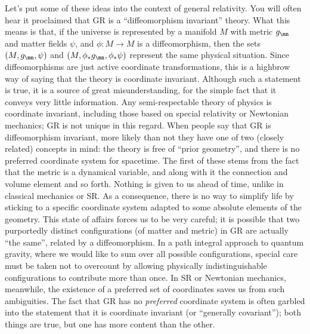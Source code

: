 Let's put some of these ideas into the context of general relativity.
You will often hear it proclaimed that GR is a ``diffeomorphism
invariant'' theory.  What this means is that, if the universe is 
represented by a manifold $M$ with metric $g_\mn$ and matter fields
$\psi$, and $\phi:M\rightarrow M$ is a diffeomorphism, then the sets 
$(M,g_\mn,\psi)$ and $(M, \phi_*g_\mn,\phi_*\psi)$ represent the same
physical situation.  Since diffeomorphisms are just active coordinate
transformations, this is a highbrow way of saying that the theory is
coordinate invariant.  Although such a statement is true, it is a 
source of great misunderstanding, for the simple fact that it conveys
very little information.  Any semi-respectable theory of physics is
coordinate invariant, including those based on special relativity or
Newtonian mechanics; GR is not unique in this regard.  When people say 
that GR is diffeomorphism invariant, more likely than not they have one 
of two (closely related) concepts in mind: the theory is free of ``prior 
geometry'', and there is no preferred coordinate system for spacetime.
The first of these stems from the fact that the metric is a 
dynamical variable, and along with it the connection and volume
element and so forth.  Nothing is given to us ahead of time, unlike in
classical mechanics or SR.  As a consequence, there is no way to
simplify life by sticking to a specific coordinate system adapted to
some absolute elements of the geometry.  This state of affairs forces
us to be very careful; it is possible that two purportedly distinct
configurations (of matter and metric) in GR are actually ``the same'',
related by a diffeomorphism.  In a path integral approach to quantum
gravity, where we would like to sum over all possible configurations,
special care must be taken not to overcount by allowing physically
indistinguishable configurations to contribute more than once.  In
SR or Newtonian mechanics, meanwhile, the existence of a preferred 
set of coordinates saves us from such ambiguities.  The fact that GR
has no {\it preferred} coordinate system is often garbled into the
statement that it is coordinate invariant (or ``generally covariant'');
both things are true, but one has more content than the other.

